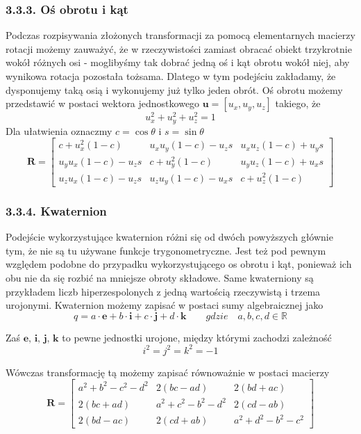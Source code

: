 \documentclass{article}
\begin{document}
\subsubsection*{\Large{3.3.3. Oś obrotu i kąt}}
Podczas rozpisywania złożonych transformacji za pomocą elementarnych macierzy rotacji możemy zauważyć, że w rzeczywistości zamiast obracać obiekt trzykrotnie wokół różnych osi - moglibyśmy tak dobrać jedną oś i kąt obrotu wokół niej, aby wynikowa rotacja pozostała tożsama. Dlatego w tym podejściu zakładamy, że dysponujemy taką osią i wykonujemy już tylko jeden obrót. Oś obrotu możemy przedstawić w postaci wektora jednostkowego $\textbf{u} = [u_x, u_y, u_z]$ takiego, że 
\[u_x^2+u_y^2+u_z^2 = 1 \]
Dla ułatwienia oznaczmy $c = \cos \theta$ i $s = \sin \theta$
\[
\mathbf{R} = \begin{bmatrix}
c+u_{x}^2(1-c) & u_{x}u_{y}(1-c)-u_{z}s & u_{x}u_{z}(1-c)+u_{y}s \\
u_{y}u_{x}(1-c)-u_{z}s & c+u_{y}^2(1-c) & u_{y}u_{z}(1-c)+u_{x}s \\
u_{z}u_{x}(1-c)-u_{z}s & u_{z}u_{y}(1-c)-u_{x}s & c+u_{z}^2(1-c)
\end{bmatrix}
\]

\subsubsection*{\Large{3.3.4. Kwaternion}}
Podejście wykorzystujące kwaternion różni się od dwóch powyższych głównie tym, że nie są tu używane funkcje trygonometryczne. Jest też pod pewnym względem podobne do przypadku wykorzystującego os obrotu i kąt, ponieważ ich obu nie da się rozbić na mniejsze obroty składowe. Same kwaterniony są przykładem liczb hiperzespolonych z jedną wartością rzeczywistą i trzema urojonymi. Kwaternion możemy zapisać w postaci sumy algebraicznej jako
\[q = a \cdot \textbf{e} + b \cdot \textbf{i} + c \cdot \textbf{j} + d \cdot \textbf{k} \qquad gdzie \quad a, b, c, d \in \mathbb{R} \]

Zaś $\textbf{e, i, j, k}$ to pewne jednostki urojone, między którymi zachodzi zależność 
\[i^2 = j^2 = k^2 = -1 \]

Wówczas transformację tą możemy zapisać równoważnie w postaci macierzy
\[
\mathbf{R} = \begin{bmatrix}
a^2+b^2-c^2-d^2 & 2(bc-ad) & 2(bd+ac) \\
2(bc+ad) & a^2+c^2-b^2-d^2 & 2(cd-ab) \\
2(bd-ac) & 2(cd + ab) & a^2+d^2-b^2-c^2
\end{bmatrix}
\]
\end{document}
